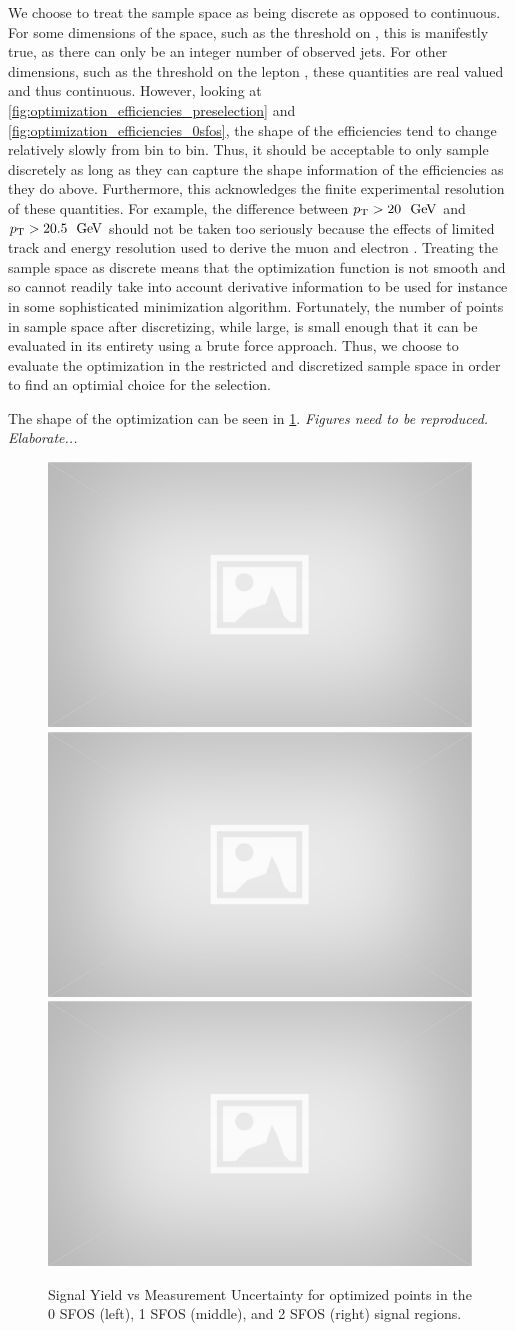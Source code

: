 We choose to treat the sample space as being discrete as opposed
to continuous. For some dimensions of the space, such as 
the threshold on \njet, this is manifestly true, as there 
can only be an integer number of observed jets. 
For other dimensions, such as the threshold on the lepton
\pt, these quantities are real valued and thus continuous.
However, looking at \fig\ref{fig:optimization_efficiencies_preselection} 
and \fig\ref{fig:optimization_efficiencies_0sfos}, the shape
of the efficiencies tend to change relatively slowly from bin
to bin. Thus, it should be acceptable to only sample 
discretely as long as they can capture the shape information of 
the efficiencies as they do above. Furthermore, 
this acknowledges the finite  experimental resolution of these 
quantities. For example,
the difference between $\pt > 20~\GeV$ and $\pt > 20.5~\GeV$
should not be taken too seriously because the effects of limited
track and energy resolution used to derive the muon and electron \pt.
Treating the sample space as discrete means that the optimization
function is not smooth and so cannot readily take into account
derivative information to be used for instance 
in some sophisticated minimization algorithm.
Fortunately, the number of points in sample space after discretizing, 
while large, is small enough that it can be evaluated in its entirety
using a brute force approach. Thus, we choose to evaluate the 
optimization in the restricted and discretized sample space in order
to find an optimial choice for the selection.


The shape of the optimization can be seen in \fig\ref{fig:optimization}.
\emph{Figures need to be reproduced. Elaborate...} 


\begin{figure}[ht!]
\centering
\includegraphics[width=0.3\columnwidth]{figures/placeholder.eps}
\includegraphics[width=0.3\columnwidth]{figures/placeholder.eps}
\includegraphics[width=0.3\columnwidth]{figures/placeholder.eps}
\caption{Signal Yield vs Measurement Uncertainty for optimized points 
in the 0 SFOS (left), 1 SFOS (middle), and 2 SFOS (right) signal regions.}
\label{fig:optimization}
\end{figure}



